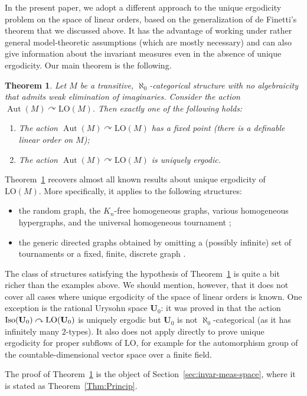 \documentclass[JEP,XML,SOM,Unicode,published]{cedram}
\let\actson\curvearrowright
\theoremstyle{plain}
\newtheorem{theorem}{Theorem}[section]
\theoremstyle{definition}
\newcommand{\bU}{{\mathbf U}}
\DeclareMathOperator{\Aut}{Aut}
\DeclareMathOperator{\Iso}{Iso}
\newcommand{\LO}{\mathrm{LO}}
\begin{document}
In the present paper, we adopt a different approach to the unique ergodicity problem on the space of linear orders, based on the generalization of de Finetti's theorem that we discussed above. It has the advantage of working under rather general model-theoretic assumptions (which are mostly necessary) and can also give information about the invariant measures even in the absence of unique ergodicity. Our main theorem is the following.
\begin{theorem}
\label{th:intro:main} Let $M$ be a transitive, $\aleph_0$-categorical structure with no algebraicity that admits weak elimination of imaginaries. Consider the action $\Aut(M) \actson \LO(M)$. Then exactly one of the following holds:
\begin{enumerate}
\item The action $\Aut(M) \actson \LO(M)$ has a fixed point (\ie there is a definable linear order on $M$);
\item The action $\Aut(M) \actson \LO(M)$ is uniquely ergodic.
\end{enumerate}
\end{theorem}
Theorem~\ref{th:intro:main} recovers almost all known results about unique ergodicity of $\LO(M)$. More specifically, it applies to the following structures:
\begin{itemize}
\item the random graph, the $K_n$-free homogeneous graphs, various homogeneous hypergraphs, and the universal homogeneous tournament \cite{Angel2014};

\item the generic directed graphs obtained by omitting a (possibly infinite) set of tournaments or a fixed, finite, discrete graph \cite{Pawliuk2020}.
\end{itemize}
The class of structures satisfying the hypothesis of Theorem~\ref{th:intro:main} is quite a bit richer than the examples above. We should mention, however, that it does not cover all cases where unique ergodicity of the space of linear orders is known. One exception is the rational Urysohn space $\bU_0$: it was proved in \cite{Angel2014} that the action $\Iso(\bU_0) \actson\nobreak \LO(\bU_0)$ is uniquely ergodic but $\bU_0$ is not $\aleph_0$-categorical (as it has infinitely many $2$-types). It also does not apply directly to prove unique ergodicity for proper subflows of $\LO$, for example for the automorphism group of the countable-dimensional vector space over a finite field.

The proof of Theorem~\ref{th:intro:main} is the object of Section~\ref{sec:invar-meas-space}, where it is stated as Theorem~\ref{Thm:Princip}.
\end{document}
